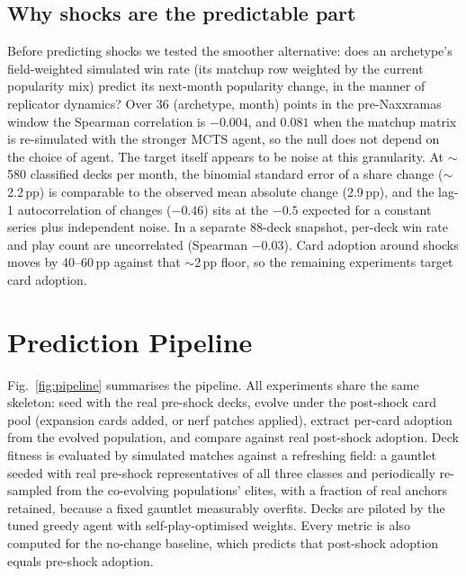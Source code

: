 \documentclass[conference]{IEEEtran}
\newcommand{\pp}{\,\text{pp}}
\begin{document}
\subsection{Why shocks are the predictable part}
\label{sec:dynamics}
Before predicting shocks we tested the smoother alternative: does an
archetype's field-weighted simulated win rate (its matchup row
weighted by the current popularity mix) predict its next-month
popularity change, in the manner of replicator dynamics? Over 36
(archetype, month) points in the pre-Naxxramas window the Spearman
correlation is $-0.004$, and $0.081$ when the matchup matrix is
re-simulated with the stronger MCTS agent, so the null does not
depend on the choice of agent. The target itself appears to be
noise at this granularity. At $\sim$580 classified decks per month,
the binomial standard error of a share change ($\sim$2.2$\pp$) is
comparable to the observed mean absolute change (2.9$\pp$), and the
lag-1 autocorrelation of changes ($-0.46$) sits at the $-0.5$
expected for a constant series plus independent noise. In a
separate 88-deck snapshot, per-deck win rate and play count are
uncorrelated (Spearman $-0.03$). Card adoption around shocks moves
by 40--60$\pp$ against that $\sim$2$\pp$ floor, so the remaining
experiments target card adoption.

\section{Prediction Pipeline}
\label{sec:pipeline}

Fig.~\ref{fig:pipeline} summarises the pipeline. All experiments
share the same skeleton: seed with the real pre-shock decks, evolve
under the post-shock card pool (expansion cards added, or nerf
patches applied), extract per-card adoption from the evolved
population, and compare against real post-shock adoption. Deck
fitness is evaluated by simulated matches against a refreshing
field: a gauntlet seeded with real pre-shock representatives of all
three classes and periodically re-sampled from the co-evolving
populations' elites, with a fraction of real anchors retained,
because a fixed gauntlet measurably overfits. Decks are piloted by
the tuned greedy agent with self-play-optimised weights. Every
metric is also computed for the no-change baseline, which predicts
that post-shock adoption equals pre-shock adoption.
\end{document}
